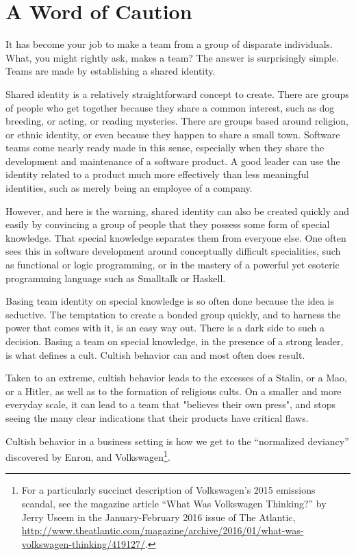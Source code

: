 \section{A Word of Caution}

It has become your job to make a team from a group of disparate individuals. What, you might rightly ask, makes a team? The answer is surprisingly simple. Teams are made by establishing a shared identity.

Shared identity is a relatively straightforward concept to create. There are groups of people who get together because they share a common interest, such as dog breeding, or acting, or reading mysteries. There are groups based around religion, or ethnic identity, or even because they happen to share a small town. Software teams come nearly ready made in this sense, especially when they share the development and maintenance of a software product. A good leader can use the identity related to a product much more effectively than less meaningful identities, such as merely being an employee of a company.

However, and here is the warning, shared identity can also be created quickly and easily by convincing a group of people that they possess some form of special knowledge. That special knowledge separates them from everyone else. One often sees this in software development around conceptually difficult specialities, such as functional or logic programming, or in the mastery of a powerful yet esoteric programming language such as Smalltalk or Haskell.

Basing team identity on special knowledge is so often done because the idea is seductive. The temptation to create a bonded group quickly, and to harness the power that comes with it, is an easy way out. There is a dark side to such a decision. Basing a team on special knowledge, in the presence of a strong leader, is what defines a cult. Cultish behavior can and most often does result.

Taken to an extreme, cultish behavior leads to the excesses of a Stalin, or a Mao, or a Hitler, as well as to the formation of religious cults. On a smaller and more everyday scale, it can lead to a team that "believes their own press", and stops seeing the many clear indications that their products have critical flaws.

Cultish behavior in a business setting is how we get to the ``normalized deviancy'' discovered by Enron, and Volkswagen\footnote{For a particularly succinct description of Volkswagen's 2015 emissions scandal, see the  magazine article ``What Was Volkswagen Thinking?'' by Jerry Useem in the January-February 2016 issue of The Atlantic, \hyperlink{http://www.theatlantic.com/magazine/archive/2016/01/what-was-volkswagen-thinking/419127/}{http://www.theatlantic.com/magazine/archive/2016/01/what-was-volkswagen-thinking/419127/}.}.

